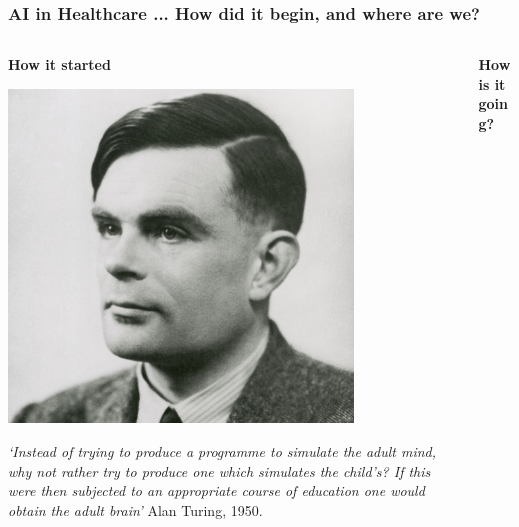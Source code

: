\begin{frame}
\frametitle{AI in Healthcare ... How did it begin, and where are we?}
\pause
\begin{columns}
    \begin{column}{0.5\textwidth}
    \begin{center}
        \textbf{How it started}\\
        \vspace{2mm}
        
        \includegraphics[width=0.77\textwidth]{./images/alan_turing.jpg}
        
        \footnotesize{\textit{`Instead of trying to produce a programme to simulate the adult mind, why not rather try to produce one which simulates the child’s? If this were then subjected to an appropriate course of education one would obtain the adult brain'} Alan Turing, 1950.}
        
    \end{center}
        
    \end{column}
\pause

    \begin{column}{0.48\textwidth}
    \begin{center}
    \textbf{How is it going?}\\
    \vspace{2mm}
        

\end{center}
\end{column}
\end{columns}
\end{frame}
